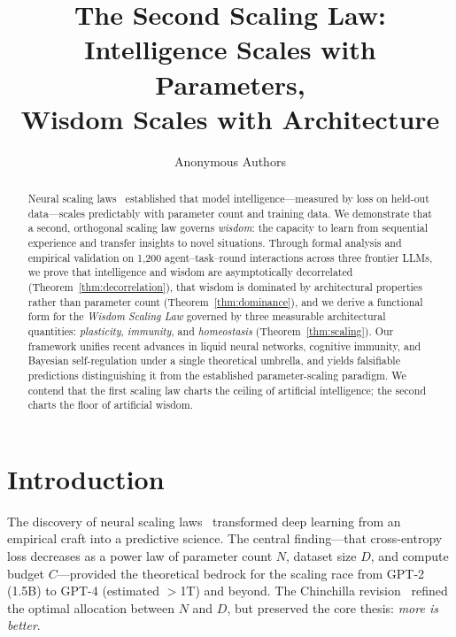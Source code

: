 \documentclass{article}
\title{The Second Scaling Law: \\
Intelligence Scales with Parameters, \\
Wisdom Scales with Architecture}
\author{Anonymous Authors}
\date{}
\begin{document}
\maketitle

\begin{abstract}
Neural scaling laws~\citep{kaplan2020scaling, hoffmann2022training} established that model intelligence---measured by loss on held-out data---scales predictably with parameter count and training data.
We demonstrate that a second, orthogonal scaling law governs \emph{wisdom}: the capacity to learn from sequential experience and transfer insights to novel situations.
Through formal analysis and empirical validation on 1{,}200 agent--task--round interactions across three frontier LLMs, we prove that intelligence and wisdom are asymptotically decorrelated (Theorem~\ref{thm:decorrelation}), that wisdom is dominated by architectural properties rather than parameter count (Theorem~\ref{thm:dominance}), and we derive a functional form for the \emph{Wisdom Scaling Law} governed by three measurable architectural quantities: \emph{plasticity}, \emph{immunity}, and \emph{homeostasis} (Theorem~\ref{thm:scaling}).
Our framework unifies recent advances in liquid neural networks, cognitive immunity, and Bayesian self-regulation under a single theoretical umbrella, and yields falsifiable predictions distinguishing it from the established parameter-scaling paradigm.
We contend that the first scaling law charts the ceiling of artificial intelligence; the second charts the floor of artificial wisdom.
\end{abstract}

\section{Introduction}
\label{sec:intro}

The discovery of neural scaling laws~\citep{kaplan2020scaling} transformed deep learning from an empirical craft into a predictive science.
The central finding---that cross-entropy loss decreases as a power law of parameter count $N$, dataset size $D$, and compute budget $C$---provided the theoretical bedrock for the scaling race from GPT-2 (1.5B) to GPT-4 (estimated $>$1T) and beyond.
The Chinchilla revision~\citep{hoffmann2022training} refined the optimal allocation between $N$ and $D$, but preserved the core thesis: \emph{more is better}.
\end{document}
